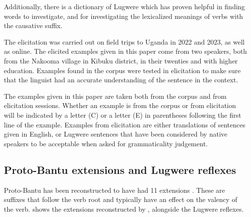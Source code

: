 \documentclass[output=paper,colorlinks,citecolor=brown,draftmode]{langscibook}
\begin{document}
Additionally, there is a dictionary of Lugwere \citep{Nzogi2012dictionary} which has proven helpful in finding words to investigate, and for investigating the lexicalized meanings of verbs with the causative suffix. 

The elicitation was carried out on field trips to Uganda in 2022 and 2023, as well as online. The elicited examples given in this paper come from two speakers, both from the Nakooma village in Kibuku district, in their twenties and with higher education. Examples found in the corpus were tested in elicitation to make sure that the linguist had an accurate understanding of the sentence in the context.

The examples given in this paper are taken both from the corpus and from elicitation sessions. Whether an example is from the corpus or from elicitation will be indicated by a letter (C) or a letter (E) in parentheses following the first line of the example. Examples from elicitation are either translations of sentences given in English, or Lugwere sentences that have been considered by native speakers to be acceptable when asked for grammaticality judgement. 



\subsection {Proto-Bantu extensions and Lugwere reflexes} \label{sec:Saebo:proto-Bantu}
\largerpage[-1]
Proto-Bantu has been reconstructed to have had 11 extensions \citep{schadeberg2019word}. These are suffixes that follow the verb root and typically have an effect on the valency of the verb.  shows the extensions reconstructed by \citet{schadeberg2019word}, alongside the Lugwere reflexes. 
\end{document}
